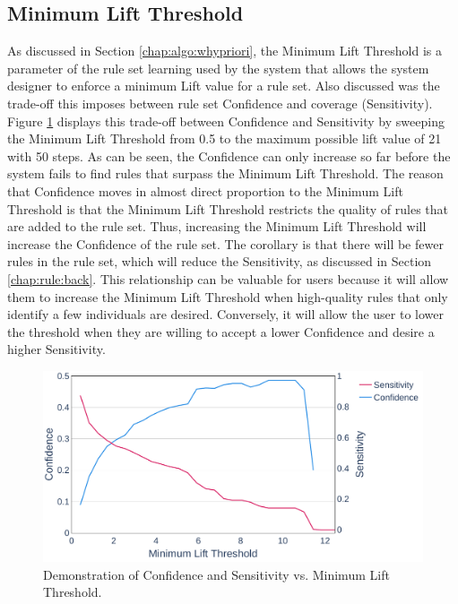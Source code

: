 \subsection{Minimum Lift Threshold} \label{chap:results:mlt}
As discussed in Section \ref{chap:algo:whypriori}, the Minimum Lift Threshold is a parameter of the rule set learning used by the \Abb system that allows the system designer to enforce a minimum Lift value for a rule set. Also discussed was the trade-off this imposes between rule set Confidence and coverage (Sensitivity).
Figure \ref{fig:conf-sweep} displays this trade-off between Confidence and Sensitivity by sweeping the Minimum Lift Threshold from 0.5 to the maximum possible lift value of 21 with 50 steps.
As can be seen, the Confidence can only increase so far before the system fails to find rules that surpass the Minimum Lift Threshold. The reason that Confidence moves in almost direct proportion to the Minimum Lift Threshold is that the Minimum Lift Threshold restricts the quality of rules that are added to the rule set. Thus, increasing the Minimum Lift Threshold will increase the Confidence of the rule set. The corollary is that there will be fewer rules in the rule set, which will reduce the Sensitivity, as discussed in Section \ref{chap:rule:back}.
This relationship can be valuable for \Abb users because it will allow them to increase the Minimum Lift Threshold when high-quality rules that only identify a few individuals are desired. Conversely, it will allow the user to lower the threshold when they are willing to accept a lower Confidence and desire a higher Sensitivity.


\begin{figure}[ht]
    \centering
    \includegraphics[width=1\textwidth]{Figures/Lift-Sweep.pdf}
		\caption{Demonstration of Confidence and Sensitivity vs. Minimum Lift Threshold.}
    \label{fig:conf-sweep}
\end{figure}

